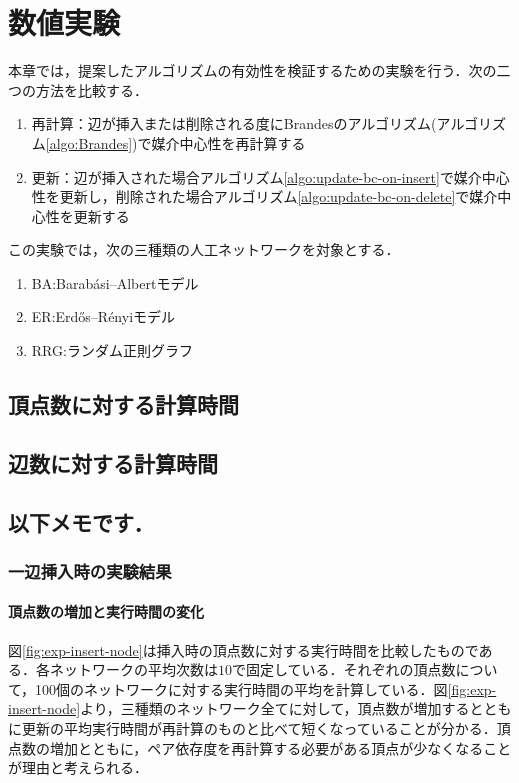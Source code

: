 \chapter{数値実験}

本章では，提案したアルゴリズムの有効性を検証するための実験を行う．次の二つの方法を比較する．
\begin{enumerate}
\item 再計算：辺が挿入または削除される度にBrandesのアルゴリズム(アルゴリズム\ref{algo:Brandes})で媒介中心性を再計算する
\item 更新：辺が挿入された場合アルゴリズム\ref{algo:update-bc-on-insert}で媒介中心性を更新し，削除された場合アルゴリズム\ref{algo:update-bc-on-delete}で媒介中心性を更新する
\end{enumerate}

この実験では，次の三種類の人工ネットワークを対象とする．
\begin{enumerate}
\item BA:Barab\'{a}si--Albertモデル
\item ER:Erd\H{o}s--R\'{e}nyiモデル
\item RRG:ランダム正則グラフ
\end{enumerate}

\section{頂点数に対する計算時間}

\section{辺数に対する計算時間}

\section{以下メモです．}

\subsection{一辺挿入時の実験結果}

\subsubsection{頂点数の増加と実行時間の変化}
図\ref{fig:exp-insert-node}は挿入時の頂点数に対する実行時間を比較したものである．各ネットワークの平均次数は$10$で固定している．それぞれの頂点数について，100個のネットワークに対する実行時間の平均を計算している．図\ref{fig:exp-insert-node}より，三種類のネットワーク全てに対して，頂点数が増加するとともに更新の平均実行時間が再計算のものと比べて短くなっていることが分かる．頂点数の増加とともに，ペア依存度を再計算する必要がある頂点が少なくなることが理由と考えられる．

